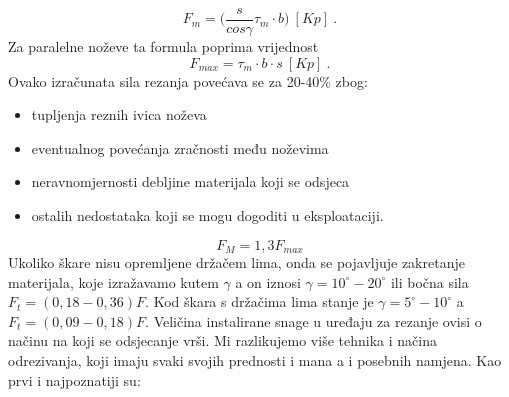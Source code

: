\documentclass[a4paper,12pt]{article}
\numberwithin{figure}{section}
\begin{document}
\begin{equation}
F_{m} = \bigg(\frac{s}{cos\gamma}\tau_{m}\cdot b\bigg)\:[Kp]\:.
\end{equation}
Za paralelne noževe ta formula poprima vrijednost
\begin{equation}
F_{max} = \tau_{m}\cdot b \cdot s\:[Kp]\:.
\end{equation}
Ovako izračunata sila rezanja povećava se za 20-40\% zbog:
\begin{itemize}
\item tupljenja reznih ivica noževa
\item eventualnog povećanja zračnosti među noževima
\item neravnomjernosti debljine materijala koji se odsjeca
\item ostalih nedostataka koji se mogu dogoditi u eksploataciji.
\end{itemize}
\begin{equation}
F_{M} = 1,3 F_{max}
\end{equation}
Ukoliko škare nisu opremljene držačem lima, onda se pojavljuje zakretanje materijala, koje izražavamo kutem $\gamma$ a on iznosi $\gamma = 10^{\circ} - 20^{\circ}$ ili bočna sila $F_{t} = (0,18 - 0,36)F$. Kod škara s držačima lima stanje je $\gamma = 5^{\circ}-10^{\circ}$ a $F_{t} = (0,09 - 0,18)F$. Veličina instalirane snage u uređaju za rezanje ovisi o načinu na koji se odsjecanje vrši. Mi razlikujemo više tehnika i načina odrezivanja, koji imaju svaki svojih prednosti i mana a i posebnih namjena. Kao prvi i najpoznatiji su:
\clearpage
\end{document}
